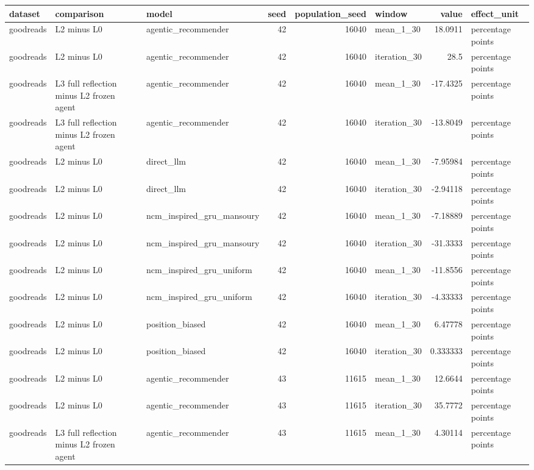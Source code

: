 \begin{table}[htbp!]
\centering
\small
\setlength{\tabcolsep}{3pt}
\renewcommand{\arraystretch}{1.1}
\begin{tabular}{lllrrlrl}
\hline
dataset & comparison & model & seed & population\_seed & window & value & effect\_unit \\
\hline
goodreads & L2 minus L0 & agentic\_recommender & 42 & 16040 & mean\_1\_30 & 18.0911 & percentage points \\
goodreads & L2 minus L0 & agentic\_recommender & 42 & 16040 & iteration\_30 & 28.5 & percentage points \\
goodreads & L3 full reflection minus L2 frozen agent & agentic\_recommender & 42 & 16040 & mean\_1\_30 & -17.4325 & percentage points \\
goodreads & L3 full reflection minus L2 frozen agent & agentic\_recommender & 42 & 16040 & iteration\_30 & -13.8049 & percentage points \\
goodreads & L2 minus L0 & direct\_llm & 42 & 16040 & mean\_1\_30 & -7.95984 & percentage points \\
goodreads & L2 minus L0 & direct\_llm & 42 & 16040 & iteration\_30 & -2.94118 & percentage points \\
goodreads & L2 minus L0 & ncm\_inspired\_gru\_mansoury & 42 & 16040 & mean\_1\_30 & -7.18889 & percentage points \\
goodreads & L2 minus L0 & ncm\_inspired\_gru\_mansoury & 42 & 16040 & iteration\_30 & -31.3333 & percentage points \\
goodreads & L2 minus L0 & ncm\_inspired\_gru\_uniform & 42 & 16040 & mean\_1\_30 & -11.8556 & percentage points \\
goodreads & L2 minus L0 & ncm\_inspired\_gru\_uniform & 42 & 16040 & iteration\_30 & -4.33333 & percentage points \\
goodreads & L2 minus L0 & position\_biased & 42 & 16040 & mean\_1\_30 & 6.47778 & percentage points \\
goodreads & L2 minus L0 & position\_biased & 42 & 16040 & iteration\_30 & 0.333333 & percentage points \\
goodreads & L2 minus L0 & agentic\_recommender & 43 & 11615 & mean\_1\_30 & 12.6644 & percentage points \\
goodreads & L2 minus L0 & agentic\_recommender & 43 & 11615 & iteration\_30 & 35.7772 & percentage points \\
goodreads & L3 full reflection minus L2 frozen agent & agentic\_recommender & 43 & 11615 & mean\_1\_30 & 4.30114 & percentage points \\

\end{tabular}
\end{table}
